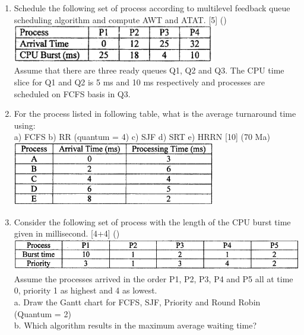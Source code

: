 \documentclass[12pt]{article}
\begin{document}
\begin{enumerate}
			\item Schedule the following set of process according to multilevel feedback queue scheduling algorithm and compute AWT and ATAT. \hfill [5] ()\\
			\includegraphics[width=3.5in]{./pics/os_19}\\
			Assume that there are three ready queues Q1, Q2 and Q3. The CPU time slice for Q1 and Q2 is 5 ms and 10 ms respectively and processes are scheduled on FCFS basis in Q3.
			
			\item For the process listed in following table, what is the average turnaround time using: \\
			a) FCFS \hspace{6mm} b) RR (quantum = 4) \hspace{6mm} c) SJF \hspace{6mm} d) SRT \hspace{6mm} e) HRRN \hfill [10] (70 Ma)\\
			\includegraphics[width=3.5in]{./pics/os_20}
			
			\item Consider the following set of process with the length of the CPU burst time given in millisecond. \hfill [4+4] ()
			\includegraphics[width=6in]{./pics/os_21}\\
			Assume the processes arrived in the order P1, P2, P3, P4 and P5 all at time 0, priority 1 as highest and 4 as lowest.\\
			a. Draw the Gantt chart for FCFS, SJF, Priority and Round Robin (Quantum = 2)\\
			b. Which algorithm results in the maximum average waiting time?
			

\end{enumerate}
\end{document}
